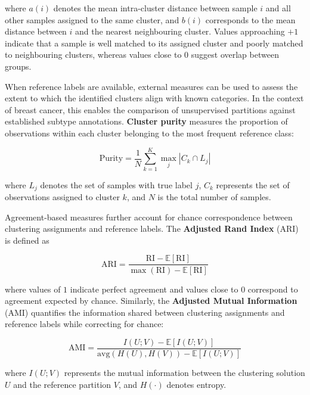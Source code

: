 \noindent where $a(i)$ denotes the mean intra-cluster distance between sample $i$ and all other samples assigned to the same cluster, and $b(i)$ corresponds to the mean distance between $i$ and the nearest neighbouring cluster. Values approaching $+1$ indicate that a sample is well matched to its assigned cluster and poorly matched to neighbouring clusters, whereas values close to $0$ suggest overlap between groups.

When reference labels are available, external measures can be used to assess the extent to which the identified clusters align with known categories. In the context of breast cancer, this enables the comparison of unsupervised partitions against established subtype annotations. \textbf{Cluster purity} measures the proportion of observations within each cluster belonging to the most frequent reference class:

\begin{equation}
\text{Purity} = \frac{1}{N} \sum_{k=1}^{K} \max_{j} \left| C_k \cap L_j \right|
\label{eq:purity}
\end{equation}

\noindent where $L_j$ denotes the set of samples with true label $j$, $C_k$ represents the set of observations assigned to cluster $k$, and $N$ is the total number of samples.

Agreement-based measures further account for chance correspondence between clustering assignments and reference labels. The \textbf{Adjusted Rand Index} (ARI) \cite{hubert1985comparing} is defined as

\begin{equation}
\text{ARI} = \frac{\text{RI} - \mathbb{E}[\text{RI}]}{\max(\text{RI}) - \mathbb{E}[\text{RI}]}
\label{eq:ari}
\end{equation}

\noindent where values of $1$ indicate perfect agreement and values close to $0$ correspond to agreement expected by chance. Similarly, the \textbf{Adjusted Mutual Information} (AMI) \cite{vinh2010information} quantifies the information shared between clustering assignments and reference labels while correcting for chance:

\begin{equation}
\text{AMI} = \frac{I(U;V) - \mathbb{E}[I(U;V)]}{\mathrm{avg}(H(U), H(V)) - \mathbb{E}[I(U;V)]}
\label{eq:ami}
\end{equation}

\noindent where $I(U;V)$ represents the mutual information between the clustering solution $U$ and the reference partition $V$, and $H(\cdot)$ denotes entropy.

